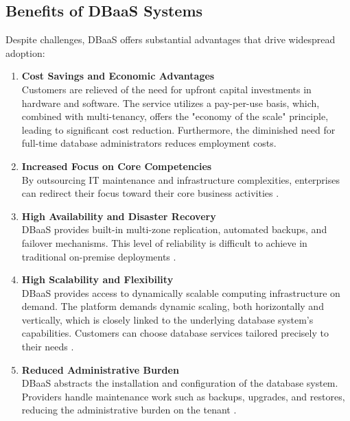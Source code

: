 \subsection{Benefits of DBaaS Systems}
Despite challenges, DBaaS offers substantial advantages that drive widespread adoption:
\begin{enumerate}[label=\alph*)]
    \item \textbf{Cost Savings and Economic Advantages}\\
    Customers are relieved of the need for upfront capital investments in hardware and software. The service utilizes a pay-per-use basis, which, combined with multi-tenancy, offers the "economy of the scale" principle, leading to significant cost reduction. Furthermore, the diminished need for full-time database administrators reduces employment costs.

    \item \textbf{Increased Focus on Core Competencies}\\
    By outsourcing IT maintenance and infrastructure complexities, enterprises can redirect their focus toward their core business activities \cite{Comparison_of_dbaas_architectures, Database_as_a_service}.

    \item \textbf{High Availability and Disaster Recovery}\\
    DBaaS provides built-in multi-zone replication, automated backups, and failover mechanisms. This level of reliability is difficult to achieve in traditional on-premise deployments \cite{Impact_of_Performance_Metrics_on_Database_Speedup_in_DBaaS}.

    \item \textbf{High Scalability and Flexibility}\\
    DBaaS provides access to dynamically scalable computing infrastructure on demand. The platform demands dynamic scaling, both horizontally and vertically, which is closely linked to the underlying database system's capabilities. Customers can choose database services tailored precisely to their needs \cite{Impact_of_Performance_Metrics_on_Database_Speedup_in_DBaaS}.

    \item \textbf{Reduced Administrative Burden}\\
    DBaaS abstracts the installation and configuration of the database system. Providers handle maintenance work such as backups, upgrades, and restores, reducing the administrative burden on the tenant \cite{Comparison_of_dbaas_architectures}.
\end{enumerate}